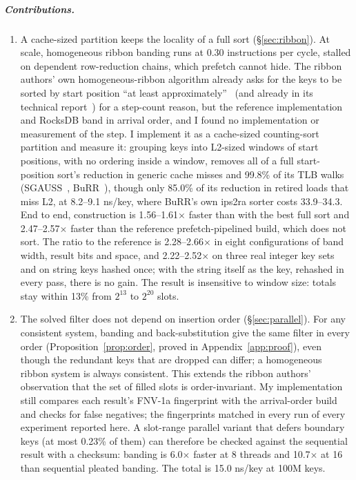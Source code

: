 \documentclass[a4paper,UKenglish,cleveref,autoref,thm-restate,anonymous]{lipics-v2021}
\begin{document}
\subparagraph*{Contributions.}
\begin{enumerate}
\item A cache-sized partition keeps the locality of a full sort (\S\ref{sec:ribbon}). At scale, homogeneous ribbon banding runs at 0.30 instructions per cycle, stalled on dependent row-reduction chains, which prefetch cannot hide. The ribbon authors' own homogeneous-ribbon algorithm already asks for the keys to be sorted by start position ``at least approximately''~\cite{dietzfelbinger2026ribbon} (and already in its technical report~\cite{dillinger2021burrtr}) for a step-count reason, but the reference implementation and RocksDB band in arrival order, and I found no implementation or measurement of the step. I implement it as a cache-sized counting-sort partition and measure it: grouping keys into L2-sized windows of start positions, with no ordering inside a window, removes all of a full start-position sort's reduction in generic cache misses and 99.8\% of its TLB walks (SGAUSS~\cite{dietzfelbinger2019gauss}, BuRR~\cite{dillinger2022burr}), though only 85.0\% of its reduction in retired loads that miss L2, at 8.2--9.1 ns/key, where BuRR's own ips2ra sorter costs 33.9--34.3. End to end, construction is 1.56--1.61$\times$ faster than with the best full sort and 2.47--2.57$\times$ faster than the reference prefetch-pipelined build, which does not sort. The ratio to the reference is 2.28--2.66$\times$ in eight configurations of band width, result bits and space, and 2.22--2.52$\times$ on three real integer key sets and on string keys hashed once; with the string itself as the key, rehashed in every pass, there is no gain. The result is insensitive to window size: totals stay within 13\% from $2^{13}$ to $2^{20}$ slots.
\item The solved filter does not depend on insertion order (\S\ref{sec:parallel}). For any consistent system, banding and back-substitution give the same filter in every order (Proposition~\ref{prop:order}, proved in Appendix~\ref{app:proof}), even though the redundant keys that are dropped can differ; a homogeneous ribbon system is always consistent. This extends the ribbon authors' observation that the set of filled slots is order-invariant. My implementation still compares each result's FNV-1a fingerprint with the arrival-order build and checks for false negatives; the fingerprints matched in every run of every experiment reported here. A slot-range parallel variant that defers boundary keys (at most 0.23\% of them) can therefore be checked against the sequential result with a checksum: banding is 6.0$\times$ faster at 8 threads and 10.7$\times$ at 16 than sequential pleated banding. The total is 15.0 ns/key at 100M keys.

\end{enumerate}
\end{document}
